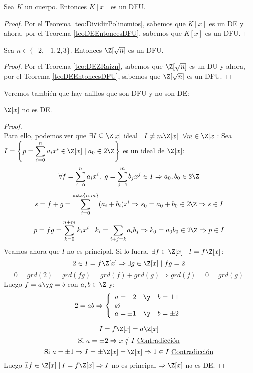 \begin{coro}
    Sea $K$ un cuerpo. Entonces $K[x]$ es un DFU.
\begin{proof}
    Por el Teorema \ref{teo:DividirPolinomios}, sabemos que $K[x]$ es un DE y ahora, por el Teorema \ref{teoDEEntoncesDFU}, sabemos
    que $K[x]$ es un DFU.
\end{proof}
\end{coro}

\begin{coro}
    Sea $n \in \{-2, -1, 2, 3\}$. Entonces $\Z[\sqrt{n}]$ es un DFU.
\begin{proof}
    Por el Teorema \ref{teo:DEZRaizn}, sabemos que $\Z[\sqrt{n}]$ es un DU y ahora, por el Teorema \ref{teoDEEntoncesDFU}, sabemos
    que $\Z[\sqrt{n}]$ es un DFU.
\end{proof}
\end{coro}

Veremos también que hay anillos que son DFU y no son DE:
\begin{prop}
    $\Z[x]$ no es DE.
\begin{proof}
    \ \\
    Para ello, podemos ver que $\exists I \subseteq \Z[x]$ ideal $\mid I\neq m\Z[x]~~\forall m \in \Z[x]$:\newline
    Sea $\displaystyle I = \left\{p = \sum_{i=0}^n a_i x^i \in \Z[x] \mid a_0 \in 2\Z \right\}$ es un ideal de $\Z[x]$:
    $$\forall f = \sum_{i=0}^n a_i x^i, ~g=\sum_{j=0}^m b_j x^j \in I \Rightarrow a_0, b_0 \in 2\Z$$
    $$s=f+g = \sum_{i=0}^{\max\{n,m\}}(a_i+b_i) x^i \Rightarrow s_0 = a_0+b_0 \in 2\Z \Rightarrow s \in I$$
    $$p = fg = \sum_{k=0}^{n+m} k_i x^i \mid k_i = \sum_{i+j=k} a_i b_j \Rightarrow k_0 = a_0b_0 \in 2\Z \Rightarrow p \in I$$
    Veamos ahora que $I$ no es principal. Si lo fuera, $\exists f \in \Z[x] \mid I = f\Z[x]$:
    $$2 \in I=f\Z[x] \Rightarrow \exists g \in \Z[x] \mid fg = 2$$
    $$0 = grd(2) = grd(fg) = grd(f) + grd(g) \Rightarrow grd(f) = 0 = grd(g)$$
    Luego $f = a \y g=b$ con $a,b \in \Z$ y:
    $$2=ab \Rightarrow \left\{\begin{array}{lll}
            a = \pm 2 & \y & b = \pm 1 \\
            \o        &    &           \\
            a = \pm 1 & \y & b = \pm 2
        \end{array} \right.$$

    $$I = f\Z[x] = a\Z[x]$$
    $$\mbox{Si } a=\pm 2 \Rightarrow x \notin I \mbox{ \underline{Contradicción}}$$
    $$\mbox{Si } a=\pm 1 \Rightarrow I=\pm\Z[x] = \Z[x] \Rightarrow 1 \in I \mbox{ \underline{Contradicción}}$$
    Luego $\nexists f \in \Z[x] \mid I=f\Z[x] \Rightarrow I$ no es principal $\Rightarrow \Z[x]$ no es DE.
\end{proof}
\end{prop}


